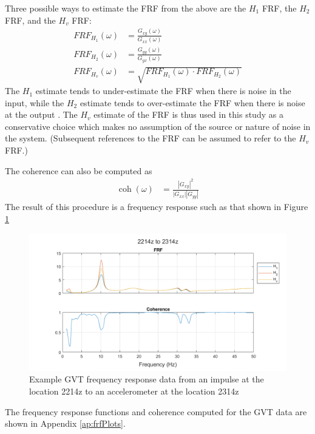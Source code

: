 Three possible ways to estimate the FRF from the above are the $H_1$ FRF, the $H_2$ FRF, and the $H_v$ FRF:
\begin{align}
    FRF_{H_1}(\omega) &= \frac{G_{xy}(\omega)}{G_{xx}(\omega)} \\
    FRF_{H_2}(\omega) &= \frac{G_{yy}(\omega)}{G_{yx}(\omega)} \\
    \label{eq:frf}
    FRF_{H_v}(\omega) &= \sqrt{FRF_{H_1}(\omega) \cdot FRF_{H_2}(\omega)}
\end{align}
The $H_1$ estimate tends to under-estimate the FRF when there is noise in the input, while the $H_2$ estimate tends to over-estimate the FRF when there is noise at the output \cite{Tischler2012}. The $H_v$ estimate of the FRF is thus used in this study as a conservative choice which makes no assumption of the source or nature of noise in the system. (Subsequent references to the FRF can be assumed to refer to the $H_v$ FRF.)

The coherence can also be computed as
\begin{align}
    \operatorname{coh}(\omega) &= \frac{|G_{xy}|^2}{|G_{xx}||G_{yy}|}
\end{align}
The result of this procedure is a frequency response such as that shown in Figure \ref{fig:gvtFreqExample}
\begin{figure}[H]
	\centering
	\label{fig:gvtFreqExample}
	\includegraphics[width=6in]{figs/sampleGVT_FRF.png}
	\caption{Example GVT frequency response data from an impulse at the location 2214z to an accelerometer at the location 2314z}
\end{figure}

The frequency response functions and coherence computed for the GVT data are shown in Appendix \ref{ap:frfPlots}.

